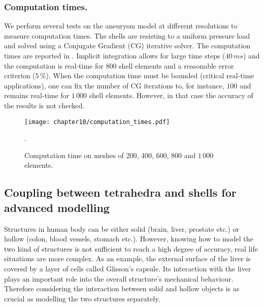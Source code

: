 \subsubsection*{Computation times.}
We perform several tests on the aneurysm model at different resolutions to measure computation times. The shells are resisting to a uniform pressure load and solved using a Conjugate Gradient (CG) iterative solver. The computation times are reported in . Implicit integration allows for large time steps ($40\,ms$) and the computation is real-time for 800 shell elements and a reasonable error criterion ($5\,\%$). When the computation time must be bounded (critical real-time applications), one can fix the number of CG iterations to, for instance, $100$ and remains real-time for $1\,000$ shell elements. However, in that case the accuracy of the results is not checked.
%
\begin{figure}
\centering
\texttt{[image: chapter10/computation\_times.pdf]}
\caption {Computation time on meshes of 200, 400, 600, 800 and $ 1\,000 $ elements.}.
\label{chap10:fig-computation}
\end{figure}

\subsection{Coupling between tetrahedra and shells for advanced modelling}
Structures in human body can be either solid (brain, liver, prostate etc.) or hollow (colon, blood vessels, stomach etc.). However, knowing how to model the two kind of structures is not sufficient to reach a high degree of accuracy, real life situations are more complex. As an example, the external surface of the liver is covered by a layer of cells called Glisson's capsule. Its interaction with the liver plays an important role into the overall structure's mechanical behaviour. Therefore considering the interaction between solid and hollow objects is as crucial as modelling the two structures separately. 

